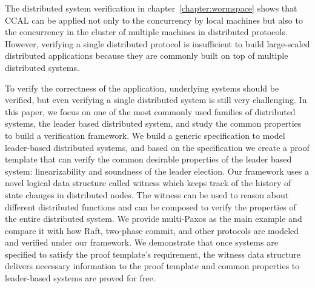 The distributed system verification in chapter~\ref{chapter:wormspace} shows 
that CCAL can be applied not only to the concurrency by local machines
but also to the concurrency in the cluster of multiple machines in distributed protocols. 
However, verifying a single distributed protocol is insufficient to build large-scaled distributed applications 
because they are commonly built on top of multiple distributed systems.

To verify the correctness of the application, underlying
systems should be verified, but even verifying a single distributed system is
still very challenging. In this paper, we focus on one of the most commonly
used families of distributed systems, the leader based distributed system, and study the common properties to build a verification framework.
We build a generic specification to model leader-based distributed systems, and based on
the specification we create a proof template that can verify the common
desirable properties of the leader based system: linearizability and soundness of
the leader election. 
Our framework uses a novel logical data structure called witness which keeps track of the history of state changes in distributed nodes.
The witness can be used to reason about different distributed functions and can
be composed to verify the properties of the entire distributed system. We provide
multi-Paxos as the main example and compare it with
how Raft, two-phase commit, and other protocols are modeled and verified under
our framework. 
We demonstrate that once systems are specified to satisfy the proof template's requirement, the witness data structure delivers necessary
information to the proof template and common properties to leader-based systems are proved for free. 


